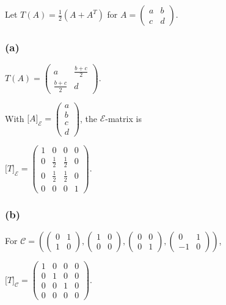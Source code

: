 Let \(T(A) = \frac{1}{2}\left( {A + A^{T}} \right)\) for \(A = \begin{pmatrix}
a & b \\
c & d
\end{pmatrix}\).

\subsubsection{(a)}

\(T(A) = \begin{pmatrix}
a & \frac{b + c}{2} \\
\frac{b + c}{2} & d
\end{pmatrix}.\)

With \(\lbrack A\rbrack_{\mathcal{E}} = \begin{pmatrix}
a \\
b \\
c \\
d
\end{pmatrix}\), the \(\mathcal{E}\)-matrix is

\(\lbrack T\rbrack_{\mathcal{E}} = \begin{pmatrix}
1 & 0 & 0 & 0 \\
0 & \frac{1}{2} & \frac{1}{2} & 0 \\
0 & \frac{1}{2} & \frac{1}{2} & 0 \\
0 & 0 & 0 & 1
\end{pmatrix}.\)

\subsubsection{(b)}

For \(\mathcal{C} = \left( {\begin{pmatrix}
0 & 1 \\
1 & 0
\end{pmatrix},\begin{pmatrix}
1 & 0 \\
0 & 0
\end{pmatrix},\begin{pmatrix}
0 & 0 \\
0 & 1
\end{pmatrix},\begin{pmatrix}
0 & 1 \\
{- 1} & 0
\end{pmatrix}} \right)\),

\(\lbrack T\rbrack_{\mathcal{C}} = \begin{pmatrix}
1 & 0 & 0 & 0 \\
0 & 1 & 0 & 0 \\
0 & 0 & 1 & 0 \\
0 & 0 & 0 & 0
\end{pmatrix}.\)

